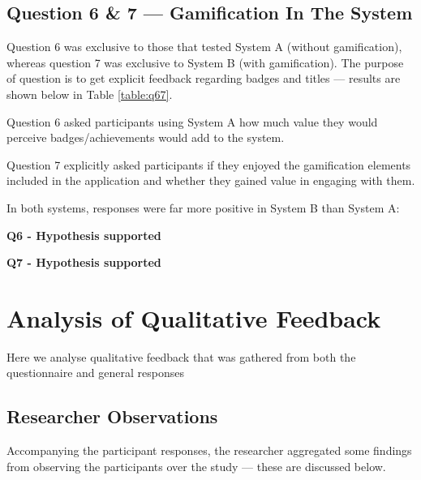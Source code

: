 \subsection{Question 6 \& 7 --- Gamification In The System}
Question 6 was exclusive to those that tested System A (without gamification), whereas question 7 was exclusive to System B (with gamification). The purpose of question is to get explicit feedback regarding badges and titles --- results are shown below in Table \ref{table:q67}. 
    \begin{table}[H]
    \caption{Table showing answers to questions 6 and 7 from the study}
    \label{table:q67}
    \end{table}
    
    Question 6 asked participants using System A how much value they would perceive badges/achievements would add to the system.
    
    Question 7 explicitly asked participants if they enjoyed the gamification elements included in the application and whether they gained value in engaging with them. 
    
    In both systems, responses were far more positive in System B than System A:    

    \textbf{Q6 - Hypothesis supported}
    
    \textbf{Q7 - Hypothesis supported}

\section{Analysis of Qualitative Feedback}
\label{sec:qualitative}
Here we analyse qualitative feedback that was gathered from both the questionnaire and general responses
\subsection{Researcher Observations}
Accompanying the participant responses, the researcher aggregated some findings from observing the participants over the study --- these are discussed below.
